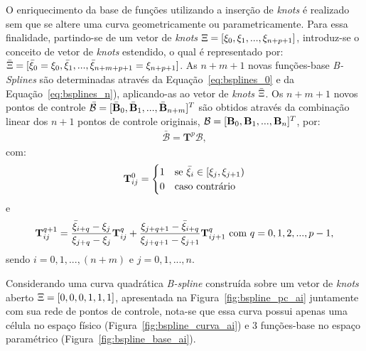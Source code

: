 O enriquecimento da base de funções utilizando a inserção de \textit{knots} é realizado sem que se altere uma curva geometricamente ou parametricamente. Para essa finalidade, partindo-se de um vetor de \textit{knots} $\Xi = [\xi_0,\xi_1, ..., \xi_{n+p+1}]$, introduz-se o conceito de vetor de \textit{knots} estendido, o qual é representado por: $\bar{\Xi} = [\bar{\xi}_0 = \xi_0,\bar{\xi}_1, ..., \bar{\xi}_{n+m+p+1}= \xi_{n+p+1}]$. As $n+m+1$ novas funções-base \textit{B-Splines} são determinadas através da Equação~\eqref{eq:bsplines_0} e da Equação~\eqref{eq:bsplines_n}), aplicando-as ao vetor de \textit{knots} $\bar{\Xi}$. Os $n+m+1$ novos pontos de controle  $\bar{\mathcal{B}} = [\bar{\mathbf{B}}_0,\bar{\mathbf{B}}_1,..., \bar{\mathbf{B}}_{n+m}]^{T}$ são obtidos através da combinação linear dos $n+1$ pontos de controle originais, $\mathcal{B} = [\mathbf{B}_0,\mathbf{B}_1,..., \mathbf{B}_{n}]^{T}$, por:
\begin{align}
	\bar{\mathcal{B}} = \mathbf{T}^{p}\mathcal{B},
\end{align}
\noindent com:
\begin{align}
	\mathbf{T}_{ij}^{0} = \begin{cases} 1 &\mbox{se } \bar{\xi}_i \in \left[\xi_j,\xi_{j+1}\right) \\
		0 & \mbox{caso contrário } \end{cases}
\end{align}
\noindent e 
\begin{align}
	\mathbf{T}_{ij}^{q+1} = \frac{\bar{\xi}_{i+q}-\xi_j}{\xi_{j+q}-\xi_j}\mathbf{T}_{ij}^{q} + \frac{\xi_{j+q+1}-\bar{\xi}_{i+q}}{\xi_{j+q+1}-\xi_{j+1}}\mathbf{T}_{ij+1}^{q} \ \text{com} \ q=0,1,2,...,p-1,
\end{align}
\noindent sendo $i=0,1,...,(n+m)$ e $j=0,1,...,n$.

Considerando uma curva quadrática \textit{B-spline} construída sobre um vetor de \textit{knots} aberto $\Xi=[0,0,0,1,1,1]$, apresentada na Figura~\ref{fig:bspline_pc_ai} juntamente com sua rede de pontos de controle, nota-se que essa curva possui apenas uma célula no espaço físico (Figura~\ref{fig:bspline_curva_ai}) e $3$ funções-base no espaço paramétrico (Figura~\ref{fig:bspline_base_ai}). 

